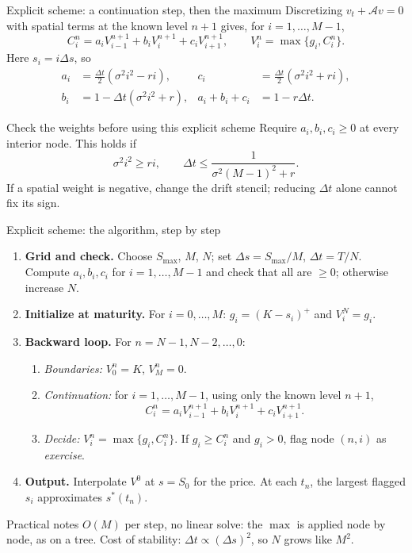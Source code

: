 \documentclass[handout,10pt,aspectratio=169]{beamer}
\begin{document}
\begin{frame}{Explicit scheme: a continuation step, then the maximum}
\small
Discretizing \(v_t+\mathcal Av=0\) with spatial terms at the known
level \(n+1\) gives, for \(i=1,\ldots,M-1\),
\[
\boxed{C_i^n=a_iV_{i-1}^{n+1}+b_iV_i^{n+1}+c_iV_{i+1}^{n+1},
\qquad V_i^n=\max\{g_i,C_i^n\}.}
\]
Here \(s_i=i\Delta s\), so
\[
\begin{aligned}
a_i&=\tfrac{\Delta t}{2}(\sigma^2i^2-ri),&
c_i&=\tfrac{\Delta t}{2}(\sigma^2i^2+ri),\\
b_i&=1-\Delta t(\sigma^2i^2+r),&
a_i+b_i+c_i&=1-r\Delta t.
\end{aligned}
\]
\begin{alertblock}{Check the weights before using this explicit scheme}
Require \(a_i,b_i,c_i\geq0\) at every interior node. This holds if
\[
\sigma^2i^2\geq ri,\qquad
\Delta t\leq\frac{1}{\sigma^2(M-1)^2+r}.
\]
If a spatial weight is negative, change the drift stencil; reducing
\(\Delta t\) alone cannot fix its sign.
\end{alertblock}
\end{frame}

\begin{frame}{Explicit scheme: the algorithm, step by step}
\small
\begin{enumerate}
\item \textbf{Grid and check.} Choose \(S_{\max}\), \(M\), \(N\); set
      \(\Delta s=S_{\max}/M\), \(\Delta t=T/N\). Compute \(a_i,b_i,c_i\) for
      \(i=1,\ldots,M-1\) and check that all are \(\geq0\); otherwise increase \(N\).
\item \textbf{Initialize at maturity.} For \(i=0,\ldots,M\):
      \(g_i=(K-s_i)^+\) and \(V_i^N=g_i\).
\item \textbf{Backward loop.} For \(n=N-1,N-2,\ldots,0\):
  \begin{enumerate}
  \item[(a)] \emph{Boundaries:} \(V_0^n=K\), \(V_M^n=0\).
  \item[(b)] \emph{Continuation:} for \(i=1,\ldots,M-1\), using only the known level \(n+1\),
        \[
        C_i^n=a_iV_{i-1}^{n+1}+b_iV_i^{n+1}+c_iV_{i+1}^{n+1}.
        \]
  \item[(c)] \emph{Decide:} \(V_i^n=\max\{g_i,C_i^n\}\). If \(g_i\geq C_i^n\)
        and \(g_i>0\), flag node \((n,i)\) as \emph{exercise}.
  \end{enumerate}
\item \textbf{Output.} Interpolate \(V^0\) at \(s=S_0\) for the price. At each
      \(t_n\), the largest flagged \(s_i\) approximates \(s^*(t_n)\).
\end{enumerate}
\begin{block}{Practical notes}
\(O(M)\) per step, no linear solve: the \(\max\) is applied node by node, as on
a tree. Cost of stability: \(\Delta t\propto(\Delta s)^2\), so \(N\) grows like \(M^2\).
\end{block}
\end{frame}
\end{document}
